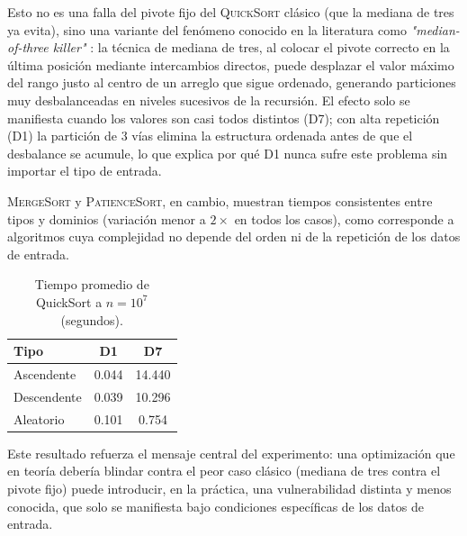Esto no es una falla del pivote fijo del \textsc{QuickSort} clásico
(que la mediana de tres ya evita), sino una variante del fenómeno
conocido en la literatura como \textit{"median-of-three killer"}
\cite{mcilroy1999}: la técnica de mediana de tres, al colocar el
pivote correcto en la última posición mediante intercambios directos,
puede desplazar el valor máximo del rango justo al centro de un
arreglo que sigue ordenado, generando particiones muy desbalanceadas
en niveles sucesivos de la recursión. El efecto solo se manifiesta
cuando los valores son casi todos distintos (D7); con alta repetición
(D1) la partición de 3 vías elimina la estructura ordenada antes de
que el desbalance se acumule, lo que explica por qué D1 nunca sufre
este problema sin importar el tipo de entrada.

\textsc{MergeSort} y \textsc{PatienceSort}, en cambio, muestran tiempos
consistentes entre tipos y dominios (variación menor a $2\times$ en
todos los casos), como corresponde a algoritmos cuya complejidad no
depende del orden ni de la repetición de los datos de entrada.

\begin{table}[h!]
\centering
\caption{Tiempo promedio de QuickSort a $n=10^7$ (segundos).}
\begin{tabular}{lcc}
\toprule
Tipo & D1 & D7 \\
\midrule
Ascendente  & 0.044 & 14.440 \\
Descendente & 0.039 & 10.296 \\
Aleatorio   & 0.101 & 0.754 \\
\bottomrule
\end{tabular}
\label{tab:quicksort_d1_d7}
\end{table}

Este resultado refuerza el mensaje central del experimento: una
optimización que en teoría debería blindar contra el peor caso
clásico (mediana de tres contra el pivote fijo) puede introducir, en
la práctica, una vulnerabilidad distinta y menos conocida, que solo
se manifiesta bajo condiciones específicas de los datos de entrada.